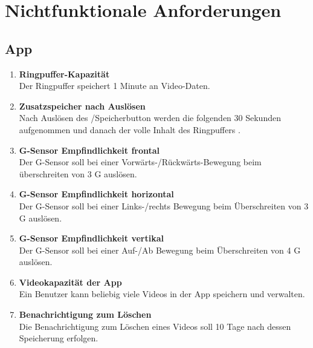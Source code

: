 \chapter{Nichtfunktionale Anforderungen}

\section{\gls{App}}
\begin{enumerate}
\renewcommand{\labelenumi}{\textbf{\theenumi}}
\renewcommand{\theenumi}{NA\arabic{enumi}0}
\setcounter{enumi}{99}
\item \label{na:Ringpuffer} \textbf{\gls{Ringpuffer}-Kapazität} \hfill\\ Der \gls{Ringpuffer} speichert 1 Minute an Video-Daten.

\item \textbf{Zusatzspeicher nach Auslösen} \hfill\\ Nach Auslösen des /Speicherbutton werden die folgenden 30 Sekunden aufgenommen und danach der volle Inhalt des Ringpuffers .

\item \label{na:GSensfront}\textbf{\gls{G-Sensor} Empfindlichkeit frontal} \hfill\\  Der \gls{G-Sensor} soll bei einer Vorwärts-/Rückwärts-Bewegung beim überschreiten von 3 G auslösen.

\item \textbf{\gls{G-Sensor} Empfindlichkeit horizontal} \hfill\\  Der \gls{G-Sensor} soll bei einer Links-/rechts Bewegung beim Überschreiten von 3 G auslösen.

\item \label{na:GSensvert}\textbf{\gls{G-Sensor} Empfindlichkeit vertikal} \hfill\\  Der \gls{G-Sensor} soll bei einer Auf-/Ab Bewegung beim Überschreiten von 4 G auslösen.

\item \textbf{Videokapazität der \gls{App}} \hfill\\  Ein Benutzer kann beliebig viele Videos in der \gls{App} speichern und verwalten.

\item \textbf{Benachrichtigung zum Löschen} \hfill\\  Die Benachrichtigung zum Löschen eines Videos soll 10 Tage nach dessen Speicherung erfolgen.
\end{enumerate}

